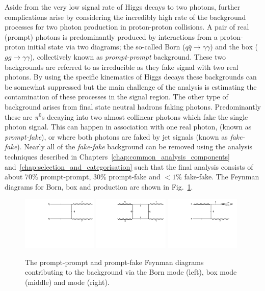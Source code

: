 Aside from the very low signal rate of Higgs decays to two photons, further complications arise by considering the incredibly high rate of the background processes for two photon production in proton-proton collisions. A pair of real (prompt) photons is predominantly produced by \QCD interactions from a proton-proton initial state via two diagrams; the so-called Born ($q\bar{q}\rightarrow\gamma\gamma$) and the box ($gg\rightarrow\gamma\gamma$), collectively known as \textit{prompt-prompt} background. These two backgrounds are referred to as irreducible as they fake signal with two real photons. By using the specific kinematics of Higgs decays these backgrounds can be somewhat suppressed but the main challenge of the analysis is estimating the contamination of these processes in the signal region. The other type of background arises from final state neutral hadrons faking photons. Predominantly these are $\pi^{0}$s decaying into two almost collinear photons which fake the single photon signal. This can happen in association with one real photon, \gjet (known as \textit{prompt-fake}), or where both photons are faked by jet signals (known as \textit{fake-fake}). Nearly all of the \textit{fake-fake} background can be removed using the analysis techniques described in Chapters~\ref{chap:common_analysis_components} and~\ref{chap:selection_and_categorisation} such that the final analysis consists of about 70\% prompt-prompt, 30\% prompt-fake and $<1\%$ fake-fake. The Feynman diagrams for Born, box and \gjet production are shown in Fig.~\ref{fig:feyn_bkgs}.

\begin{figure}
  \includegraphics[width=0.32\textwidth]{theory/plots/Born.pdf}
  \includegraphics[width=0.32\textwidth]{theory/plots/Box.pdf}
  \includegraphics[width=0.32\textwidth]{theory/plots/GJet.pdf}
  \caption[Higgs to two photon backgrounds at the \acs{LHC}]{The prompt-prompt and prompt-fake Feynman diagrams contributing to the \Hgg background via the Born mode (left), box mode (middle) and \gjet mode (right).}
  \label{fig:feyn_bkgs}
\end{figure}

